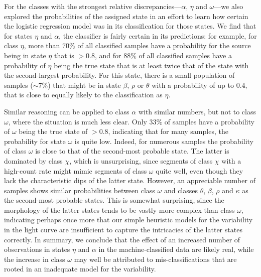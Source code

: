 \documentclass[12pt]{emulateapj}
\begin{document}
For the classes with the strongest relative discrepancies---$\alpha$, $\eta$ and $\omega$---we also explored the probabilities of the assigned state in an 
effort to learn how certain the logistic regression model was in its classification for those states. We find that for states $\eta$ and $\alpha$, the classifier is 
fairly certain in its predictions: for example, for class $\eta$, more than $70\%$ of all classified samples have a probability for the source being in state $\eta$ that is 
$>0.8$, and for $88\%$ of all classified samples have a probability of $\eta$ being the true state that is at least twice that of the state with the second-largest 
probability. For this state, there is a small population of samples ($\sim 7\%$) that might be in state $\beta$, $\rho$ or $\theta$ with a probability of up to $0.4$, that is close to equally likely to the classification as $\eta$. 

Similar reasoning can be applied to class $\alpha$ with similar numbers, but not to class $\omega$, where the situation is much less clear.
Only $33\%$ of samples have a probability of $\omega$ being the true state of $>0.8$, indicating that for many samples, the probability for state $\omega$ is quite low. Indeed, for numerous samples the probability of class $\omega$ is close to that of the second-most probable state. The latter is dominated by class $\chi$, which is unsurprising, since segments of class $\chi$ with a high-count rate might mimic segments of class $\omega$ quite well, even though they lack the characteristic dips of the latter state. However, an appreciable number of samples shows similar probabilities between class $\omega$ and classes $\theta$, $\beta$, $\rho$ and $\kappa$ as the second-most probable states. This is somewhat surprising, since the morphology of the latter states tends to be vastly more complex than class $\omega$, indicating perhaps once more that our simple heuristic models for the variability in the light curve are insufficient to capture the intricacies of the latter states correctly.
In summary, we conclude that the effect of an increased number of observations in states $\eta$ and $\alpha$ in the machine-classified data are likely real, while the increase in class $\omega$ may well be attributed to mis-classifications that are rooted in an inadequate model for the variability.
\end{document}
